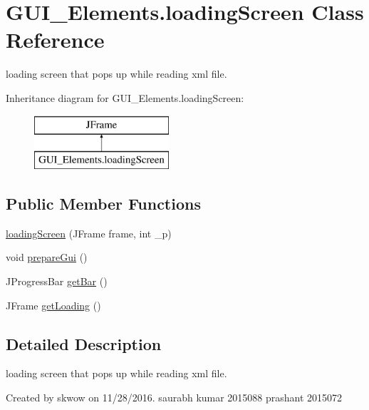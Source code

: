 \hypertarget{class_g_u_i___elements_1_1loading_screen}{}\section{G\+U\+I\+\_\+\+Elements.\+loading\+Screen Class Reference}
\label{class_g_u_i___elements_1_1loading_screen}


loading screen that pops up while reading xml file.  


Inheritance diagram for G\+U\+I\+\_\+\+Elements.\+loading\+Screen\+:\begin{figure}[H]
\begin{center}
\leavevmode
\includegraphics[height=2.000000cm]{class_g_u_i___elements_1_1loading_screen}
\end{center}
\end{figure}
\subsection*{Public Member Functions}
\begin{DoxyCompactItemize}
\item 
\hyperlink{class_g_u_i___elements_1_1loading_screen_a0fc0f5ae4d7ebb422ca36364ccc848b9}{loading\+Screen} (J\+Frame frame, int \+\_\+p)
\item 
void \hyperlink{class_g_u_i___elements_1_1loading_screen_afa7caf6e03de405b8b9c0d6619bac201}{prepare\+Gui} ()
\item 
J\+Progress\+Bar \hyperlink{class_g_u_i___elements_1_1loading_screen_a1cd168a3031086c3d15708213dd11a4b}{get\+Bar} ()
\item 
J\+Frame \hyperlink{class_g_u_i___elements_1_1loading_screen_a565b95f52e78c18e62ccb633ebb9fc49}{get\+Loading} ()
\end{DoxyCompactItemize}


\subsection{Detailed Description}
loading screen that pops up while reading xml file. 

Created by skwow on 11/28/2016. saurabh kumar 2015088 prashant 2015072 

